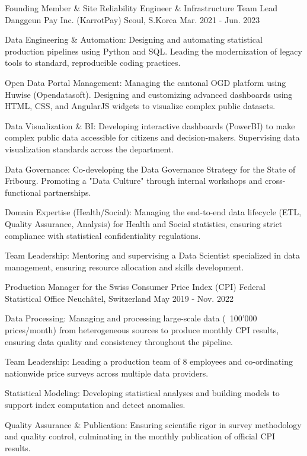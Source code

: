 \begin{cventries}
  \cventry
    {Founding Member \& Site Reliability Engineer \& Infrastructure Team Lead} %
    {Danggeun Pay Inc. (KarrotPay)} %
    {Seoul, S.Korea} %
    {Mar. 2021 - Jun. 2023} %
    {
      \begin{cvitems} %
        \item {Data Engineering \& Automation: Designing and automating statistical production pipelines using Python and SQL. Leading the modernization of legacy tools to standard, reproducible coding practices.}
        \item {Open Data Portal Management: Managing the cantonal OGD platform using Huwise (Opendatasoft). Designing and customizing advanced dashboards using HTML, CSS, and AngularJS widgets to visualize complex public datasets.}
        \item {Data Visualization \& BI: Developing interactive dashboards (PowerBI) to make complex public data accessible for citizens and decision-makers. Supervising data visualization standards across the department.}
        \item {Data Governance: Co-developing the Data Governance Strategy for the State of Fribourg. Promoting a "Data Culture" through internal workshops and cross-functional partnerships.}
        \item {Domain Expertise (Health/Social): Managing the end-to-end data lifecycle (ETL, Quality Assurance, Analysis) for Health and Social statistics, ensuring strict compliance with statistical confidentiality regulations.}
        \item {Team Leadership: Mentoring and supervising a Data Scientist specialized in data management, ensuring resource allocation and skills development.}
      \end{cvitems}
    }

  \cventry
    {Production Manager for the Swiss Consumer Price Index (CPI)} %
    {Federal Statistical Office} %
    {Neuchâtel, Switzerland} %
    {May 2019 - Nov. 2022} %
    {
      \begin{cvitems} %
        \item {Data Processing: Managing and processing large-scale data (~100'000 prices/month) from heterogeneous sources to produce monthly CPI results, ensuring data quality and consistency throughout the pipeline.}
        \item {Team Leadership: Leading a production team of 8 employees and co-ordinating nationwide price surveys across multiple data providers.}
        \item {Statistical Modeling: Developing statistical analyses and building models to support index computation and detect anomalies.}
        \item {Quality Assurance \& Publication: Ensuring scientific rigor in survey methodology and quality control, culminating in the monthly publication of official CPI results.}
      \end{cvitems}
    }


\end{cventries}
